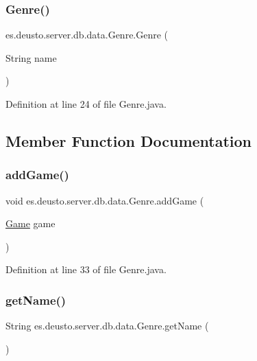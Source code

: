 \subsubsection{\texorpdfstring{Genre()}{Genre()}}
{\footnotesize\ttfamily es.\+deusto.\+server.\+db.\+data.\+Genre.\+Genre (\begin{DoxyParamCaption}\item[{String}]{name }\end{DoxyParamCaption})}



Definition at line 24 of file Genre.\+java.



\subsection{Member Function Documentation}
\mbox{\label{classes_1_1deusto_1_1server_1_1db_1_1data_1_1_genre_a268b33c42da6c59b6688db28822e2369}} 
\subsubsection{\texorpdfstring{add\+Game()}{addGame()}}
{\footnotesize\ttfamily void es.\+deusto.\+server.\+db.\+data.\+Genre.\+add\+Game (\begin{DoxyParamCaption}\item[{\hyperlink{classes_1_1deusto_1_1server_1_1db_1_1data_1_1_game}{Game}}]{game }\end{DoxyParamCaption})}



Definition at line 33 of file Genre.\+java.

\mbox{\label{classes_1_1deusto_1_1server_1_1db_1_1data_1_1_genre_a9a68a612e2209b224801f1f7e0e9dcc9}} 
\subsubsection{\texorpdfstring{get\+Name()}{getName()}}
{\footnotesize\ttfamily String es.\+deusto.\+server.\+db.\+data.\+Genre.\+get\+Name (\begin{DoxyParamCaption}{ }\end{DoxyParamCaption})}



